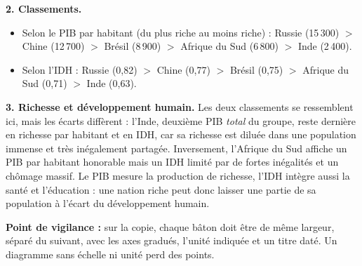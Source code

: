 \documentclass[11pt]{article}
\begin{document}
\begin{corrige}
\textbf{2. Classements.}
\begin{itemize}
\item Selon le PIB par habitant (du plus riche au moins riche) : Russie (15\,300) $>$ Chine (12\,700) $>$ Brésil (8\,900) $>$ Afrique du Sud (6\,800) $>$ Inde (2\,400).
\item Selon l'IDH : Russie (0,82) $>$ Chine (0,77) $>$ Brésil (0,75) $>$ Afrique du Sud (0,71) $>$ Inde (0,63).
\end{itemize}

\textbf{3. Richesse et développement humain.} Les deux classements se ressemblent ici, mais les écarts diffèrent : l'Inde, deuxième PIB \emph{total} du groupe, reste dernière en richesse par habitant et en IDH, car sa richesse est diluée dans une population immense et très inégalement partagée. Inversement, l'Afrique du Sud affiche un PIB par habitant honorable mais un IDH limité par de fortes inégalités et un chômage massif. Le PIB mesure la production de richesse, l'IDH intègre aussi la santé et l'éducation : une nation riche peut donc laisser une partie de sa population à l'écart du développement humain.

\textbf{Point de vigilance :} sur la copie, chaque bâton doit être de même largeur, séparé du suivant, avec les axes gradués, l'unité indiquée et un titre daté. Un diagramme sans échelle ni unité perd des points.
\end{corrige}
\end{document}
